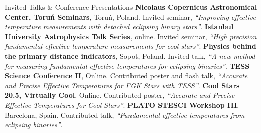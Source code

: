 \begin{rubric}{Invited Talks \& Conference Presentations}
\entry*[2023]%
        \textbf{Nicolaus Copernicus Astronomical Center, Toru\'{n} Seminars}, Toru\'{n}, Poland. Invited seminar, \textit{``Improving effective temperature measurements with detached eclipsing binary stars''}.
\entry*[2022]%
        \textbf{Istanbul University Astrophysics Talk Series}, online. Invited seminar, \textit{``High precision fundamental effective temperature measurements for cool stars''}.
\entry*[2021]%
	\textbf{Physics behind the primary distance indicators}, Sopot, Poland. Invited talk, \textit{``A new method for measuring fundamental effective temperatures for eclipsing binaries''}.
\entry*[2021]%
	\textbf{TESS Science Conference II}, Online. Contributed poster and flash talk, \textit{``Accurate and Precise Effective Temperatures for FGK Stars with TESS''}. 
\entry*[2021]%
	\textbf{Cool Stars 20.5, Virtually Cool}, Online. Contributed poster, \textit{``Accurate and Precise Effective Temperatures for Cool Stars''}. 
\entry*[2019]%
	\textbf{PLATO STESCI Workshop III}, Barcelona, Spain. Contributed talk, \textit{``Fundamental effective temperatures from eclipsing binaries''}.  
%
%
%
%
\end{rubric}